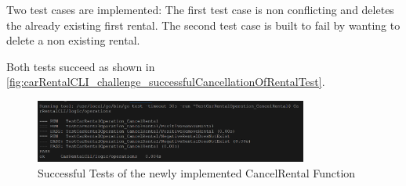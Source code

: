 Two test cases are implemented:
The first test case is non conflicting and deletes the already existing first rental.
The second test case is built to fail by wanting to delete a non existing rental.

Both tests succeed as shown in \autoref{fig:carRentalCLI_challenge_successfulCancellationOfRentalTest}.

\begin{figure}
    \centering
    \includegraphics[width=0.8\textwidth]{figures/goLang/carRental/carRentalCLI/challenge/carRentalCLI_challenge_successfulCancellationOfRentalTest.png}
    \caption{Successful Tests of the newly implemented CancelRental Function}
    \label{fig:carRentalCLI_challenge_successfulCancellationOfRentalTest}
\end{figure}

